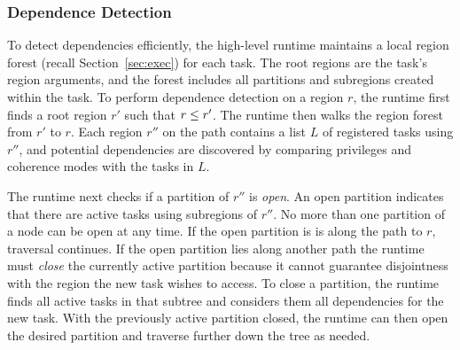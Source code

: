 

\subsubsection{Dependence Detection}
\label{subsec:depdetect}

To detect dependencies efficiently, the high-level runtime maintains a
local region forest (recall Section~\ref{sec:exec}) for each task.  The
root regions are the task's region arguments, and the forest includes
all partitions and subregions created within the task.  To perform
dependence detection on a region $r$, the runtime first finds a root
region $r'$ such that $r \leq r'$.  The runtime then walks the region
forest from $r'$ to $r$.  Each region $r''$ on the path contains a
list $L$ of registered tasks using $r''$, and potential dependencies
are discovered by comparing privileges and coherence modes with the
tasks in $L$.

The runtime next checks if a partition of $r''$ is {\em open}.  An
open partition indicates that there are active tasks using subregions
of $r''$.  No more than one partition of a node can be open
at any time.  If the open partition is is along the path to $r$,
traversal continues.  If the open partition lies along another 
path the runtime must {\em close} the currently active partition because it cannot guarantee
disjointness with the region the new task wishes to access.  To close a
partition, the runtime finds all active tasks in that
subtree and considers them all dependencies for the new task.  
With the previously active partition closed, the runtime can 
then open the desired partition and traverse further down the tree as
needed.

